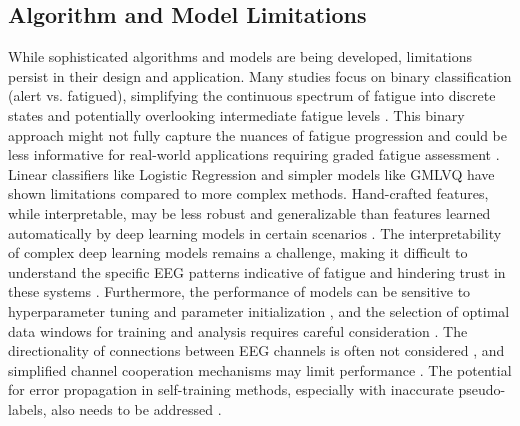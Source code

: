 \subsection{Algorithm and Model Limitations}
While sophisticated algorithms and models are being developed, limitations persist in their design and application.  Many studies focus on binary classification (alert vs. fatigued), simplifying the continuous spectrum of fatigue into discrete states and potentially overlooking intermediate fatigue levels \citep{Budak_U_2019, Chai_R_2017_1, Chen_J_2021, Chen_J_2022_2, Chen_J_2023, Cheng_E_2019, Hu_J_2017, Kim_D_2022, Kouchaki_S_2018, Li_R_2023_3, Nguyen_H_2023, Zhang_T_2021_1, Zou_S_2020_1, Chen_L_2015, Chen_D_2025, Zhang_Y_2023_4}.  This binary approach might not fully capture the nuances of fatigue progression and could be less informative for real-world applications requiring graded fatigue assessment \citep{Budak_U_2019, Chai_R_2017_1, Chen_J_2021, Chen_J_2022_2, Chen_J_2023, Cheng_E_2019, Hu_J_2017, Kim_D_2022, Kouchaki_S_2018, Li_R_2023_3, Nguyen_H_2023, Zhang_T_2021_1, Zou_S_2020_1, Chen_L_2015, Chen_D_2025, Zhang_Y_2023_4}.  Linear classifiers like Logistic Regression \citep{Liang_Y_2019} and simpler models like GMLVQ \citep{Golz_M_2020} have shown limitations compared to more complex methods.  Hand-crafted features, while interpretable, may be less robust and generalizable than features learned automatically by deep learning models in certain scenarios \citep{Chinara_V_2021}.  The interpretability of complex deep learning models remains a challenge, making it difficult to understand the specific EEG patterns indicative of fatigue and hindering trust in these systems \citep{Cui_J_2021, Cui_J_2023_1, Ko_W_2020, Sangeetha_S_2023, Sheykhivand_S_2022, Zhang_M_2022}.  Furthermore, the performance of models can be sensitive to hyperparameter tuning and parameter initialization \citep{Bencsik_B_2023, Chen_K_2023, Ma_C_2024, Sharma_S_2021, Song_K_2021, Yuan_L_2024, Feng_X_2025, Gao_D_2024_2, Zhao_Y_2023}, and the selection of optimal data windows for training and analysis requires careful consideration \citep{Jung_S_2017, Liang_Y_2019, Shahbakhti_M_2023, Wang_J_2022}.  The directionality of connections between EEG channels is often not considered \citep{Chen_K_2024}, and simplified channel cooperation mechanisms may limit performance \citep{Pan_Y_2020, Paulo_J_2021}.  The potential for error propagation in self-training methods, especially with inaccurate pseudo-labels, also needs to be addressed \citep{Liu_Y_2024, Feng_X_2025}.

